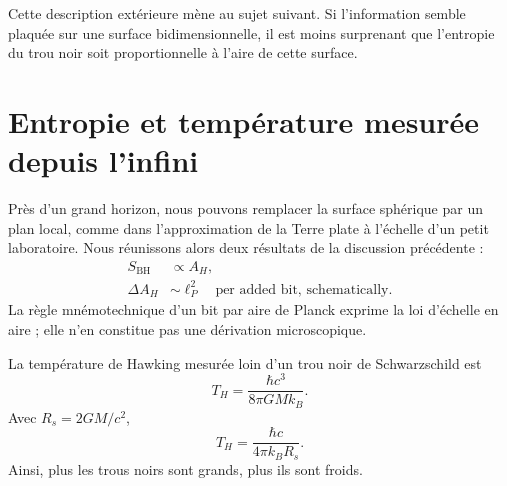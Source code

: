 \begin{classroomqa}
\end{classroomqa}

\begin{classroomqa}
\end{classroomqa}

Cette description extérieure mène au sujet suivant. Si l’information semble plaquée sur une surface bidimensionnelle, il est moins surprenant que l’entropie du trou noir soit proportionnelle à l’aire de cette surface.

\section{Entropie et température mesurée depuis l’infini}

Près d’un grand horizon, nous pouvons remplacer la surface sphérique par un plan local, comme dans l’approximation de la Terre plate à l’échelle d’un petit laboratoire. Nous réunissons alors deux résultats de la discussion précédente :
\begin{equation}
\begin{aligned}
S_{\mathrm{BH}}&\propto A_H,\\
\Delta A_H&\sim \ell_P^2
\quad\text{per added bit, schematically}.
\end{aligned}
\end{equation}
La règle mnémotechnique d’un bit par aire de Planck exprime la loi d’échelle en aire ; elle n’en constitue pas une dérivation microscopique.

La température de Hawking mesurée loin d’un trou noir de Schwarzschild est
\begin{equation}
T_H=\frac{\hbar c^3}{8\pi GMk_B}.
\label{eq:l05-hawking}
\end{equation}
Avec \(R_s=2GM/c^2\),
\begin{equation}
T_H=\frac{\hbar c}{4\pi k_B R_s}.
\label{eq:l05-hawking-radius}
\end{equation}
Ainsi, plus les trous noirs sont grands, plus ils sont froids.

